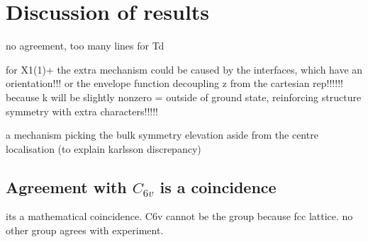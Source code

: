 \section{Discussion of results}

no agreement, too many lines for Td

for X1(1)+ the extra mechanism could be caused by the interfaces, which have an orientation!!! or the envelope function decoupling z from the cartesian rep!!!!!! because k will be slightly nonzero = outside of ground state, reinforcing structure symmetry with extra characters!!!!!

a mechanism picking the bulk symmetry elevation aside from  the centre localisation (to explain karlsson discrepancy)

\subsection{Agreement with $C_{6v}$ is a coincidence}
its a mathematical coincidence. C6v cannot be the group because fcc lattice. no other group agrees with experiment.


